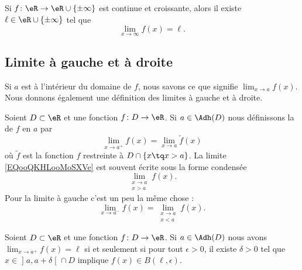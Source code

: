 \begin{proposition}     \label{PROPooGQHKooWgykjW}
	Si \( f\colon \eR\to \eR\cup\{ \pm\infty \}\) est continue et croissante, alors il existe \( \ell\in \eR\cup\{ \pm\infty \}\) tel que
	\begin{equation}
		\lim_{x\to \infty} f(x)=\ell.
	\end{equation}
\end{proposition}

\subsection{Limite à gauche et à droite}

Si \( a\) est à l'intérieur du domaine de \( f\), nous savons ce que signifie \( \lim_{x\to a} f(x)\). Nous donnons également une définition des limites à gauche et à droite.

\begin{definition}
	Soient \( D\subset \eR\) et une fonction \( f\colon D\to \eR\). Si \( a\in \Adh(D)\) nous définissons la  de \( f\) en \( a\) par
	\begin{equation}        \label{EQooQKHLooMoSXVe}
		\lim_{x\to a^+} f(x)=\lim_{x\to a} \tilde f(x)
	\end{equation}
	où \( \tilde f\) est la fonction \( f\) restreinte à \( D\cap\{ x\tq x>a \}\). La limite \eqref{EQooQKHLooMoSXVe} est souvent écrite sous la forme condensée
	\begin{equation}
		\lim_{\substack{x\to a\\x>a}}f(x).
	\end{equation}
	Pour la limite à gauche c'est un peu la même chose :
	\begin{equation}
		\lim_{x\to a^-} f(x)=\lim_{\substack{x\to a\\x<a}}f(x).
	\end{equation}
\end{definition}

\begin{lemma}       \label{LEMooXJMFooCkzoVi}
	Soient \( D\subset \eR\) et une fonction \( f\colon D\to \eR\). Si \( a\in \Adh(D)\) nous avons \( \lim_{x\to a^+} f(x)=\ell\) si et seulement si pour tout \( \epsilon>0\), il existe \( \delta>0\) tel que  \( x\in\mathopen] a , a+\delta \mathclose[\cap D\) implique \( f(x)\in B(\ell,\epsilon)\).
\end{lemma}

